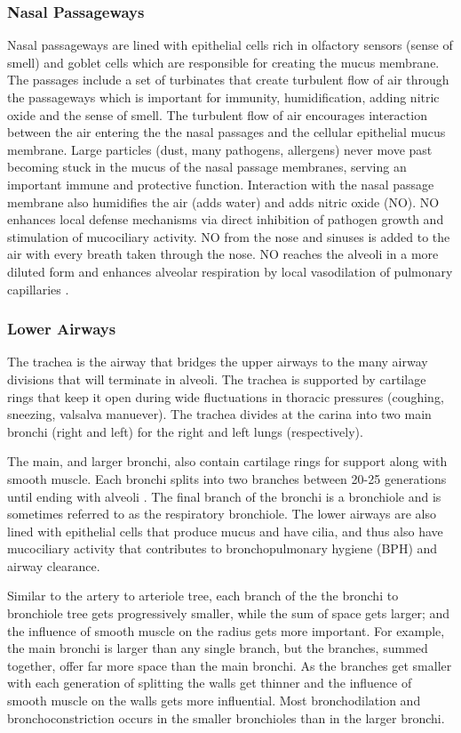 \subsubsection{Nasal Passageways} 
Nasal passageways are lined with epithelial cells rich in olfactory sensors (sense of smell) and goblet cells which are responsible for creating the mucus membrane. The passages include a set of turbinates that create turbulent flow of air through the passageways which is important for immunity, humidification, adding nitric oxide and the sense of smell. The turbulent flow of air encourages interaction between the air entering the the nasal passages and the cellular epithelial mucus membrane. Large particles (dust, many pathogens, allergens) never move past becoming stuck in the mucus of the nasal passage membranes, serving an important immune and protective function. Interaction with the nasal passage membrane also humidifies the air (adds water) and adds nitric oxide (NO). NO enhances local defense mechanisms via direct inhibition of pathogen growth and stimulation of mucociliary activity. NO from the nose and sinuses is added to the air with every breath taken through the nose. NO reaches the alveoli in a more diluted form and enhances alveolar respiration by local vasodilation of pulmonary capillaries \cite{tornberg_nasal_2002, lundberg_nitric_2008}.

\subsubsection{Lower Airways}
The trachea is the airway that bridges the upper airways to the many airway divisions that will terminate in alveoli. The trachea is supported by cartilage rings that keep it open during wide fluctuations in thoracic pressures (coughing, sneezing, valsalva manuever). The trachea divides at the carina into two main bronchi (right and left) for the right and left lungs (respectively). 

The main, and larger bronchi, also contain cartilage rings for support along with smooth muscle. Each bronchi splits into two branches between 20-25 generations until ending with alveoli \cite{hall_guyton_2020}. The final branch of the bronchi is a bronchiole and is sometimes referred to as the respiratory bronchiole. The lower airways are also lined with epithelial cells that produce mucus and have cilia, and thus also have mucociliary activity that contributes to bronchopulmonary hygiene (BPH) and airway clearance. 

Similar to the artery to arteriole tree, each branch of the the bronchi to bronchiole tree gets progressively smaller, while the sum of space gets larger; and the influence of smooth muscle on the radius gets more important. For example, the main bronchi is larger than any single branch, but the branches, summed together, offer far more space than the main bronchi. As the branches get smaller with each generation of splitting the walls get thinner and the influence of smooth muscle on the walls gets more influential. Most bronchodilation and bronchoconstriction occurs in the smaller bronchioles than in the larger bronchi.

